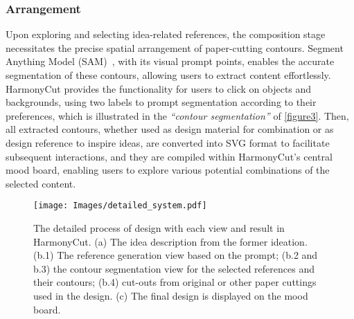 \subsubsection{Arrangement} %
Upon exploring and selecting idea-related references, the composition stage necessitates the precise spatial arrangement of paper-cutting contours. Segment Anything Model (SAM)~\cite{Kirillov:2023:sam}, with its visual prompt points, enables the accurate segmentation of these contours, allowing users to extract content effortlessly. HarmonyCut provides the functionality for users to click on objects and backgrounds, using two labels to prompt segmentation according to their preferences, which is illustrated in the \textit{``contour segmentation''} of \autoref{figure3}. Then, all extracted contours, whether used as design material for combination or as design reference to inspire ideas, are converted into SVG format to facilitate subsequent interactions, and they are compiled within HarmonyCut's central mood board, enabling users to explore various potential combinations of the selected content.


\begin{figure*}[!htbp]
\centering
\texttt{[image: Images/detailed\_system.pdf]}
\caption{\label{figure:detail system}
The detailed process of design with each view and result in HarmonyCut. (a) The idea description from the former ideation. (b.1) The reference generation view based on the prompt; (b.2 and b.3) the contour segmentation view for the selected references and their contours; (b.4) cut-outs from original or other paper cuttings used in the design. (c) The final design is displayed on the mood board.}
\end{figure*}

